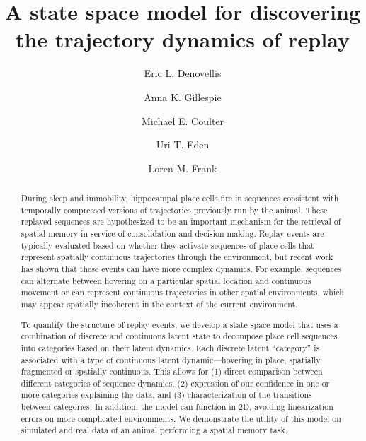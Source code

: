 \documentclass[times, twoside, watermark]{zHenriquesLab-StyleBioRxiv}
\begin{document}
\title{A state space model for discovering the trajectory dynamics of replay}

\author[4]{Eric L. Denovellis}
\author[2, 3]{Anna K. Gillespie}
\author[2, 3]{Michael E. Coulter}
\author[1]{Uri T. Eden}
\author[2, 3, 4, \Letter]{Loren M. Frank}



\maketitle

\begin{abstract}
During sleep and immobility, hippocampal place cells fire in sequences consistent with temporally compressed versions of trajectories previously run by the animal. These replayed sequences are hypothesized to be an important mechanism for the retrieval of spatial memory in service of consolidation and decision-making. Replay events are typically evaluated based on whether they activate sequences of place cells that represent spatially continuous trajectories through the environment, but recent work has shown that these events can have more complex dynamics. For example, sequences can alternate between hovering on a particular spatial location and continuous movement or can represent continuous trajectories in other spatial environments, which may appear spatially incoherent in the context of the current environment.

To quantify the structure of replay events, we develop a state space model that uses a combination of discrete and continuous latent state to decompose place cell sequences into categories based on their latent dynamics. Each discrete latent “category” is associated with a type of continuous latent dynamic—hovering in place, spatially fragmented or spatially continuous. This allows for (1) direct comparison between different categories of sequence dynamics, (2) expression of our confidence in one or more categories explaining the data, and (3) characterization of the transitions between categories. In addition, the model can function in 2D, avoiding linearization errors on more complicated environments. We demonstrate the utility of this model on simulated and real data of an animal performing a spatial memory task.

\end {abstract}
\end{document}
